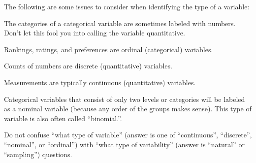 \documentclass[10pt,openany]{book}\usepackage[]{graphicx}\usepackage[]{color}
\begin{document}
The following are some issues to consider when identifying the type of a variable:
\begin{Enumerate}
  \item The categories of a categorical variable are sometimes labeled with numbers.  Don't let this fool you into calling the variable quantitative.
  \item Rankings, ratings, and preferences are ordinal (categorical) variables.
  \item Counts of numbers are discrete (quantitative) variables.
  \item Measurements are typically continuous (quantitative) variables.
  \item Categorical variables that consist of only two levels or categories will be labeled as a nominal variable (because any order of the groups makes sense).  This type of variable is also often called ``binomial.''.
  \item Do not confuse ``what type of variable'' (answer is one of ``continuous'', ``discrete'', ``nominal'', or ``ordinal'')  with ``what type of variability'' (answer is ``natural'' or ``sampling'') questions.
\end{Enumerate}

\end{document}
